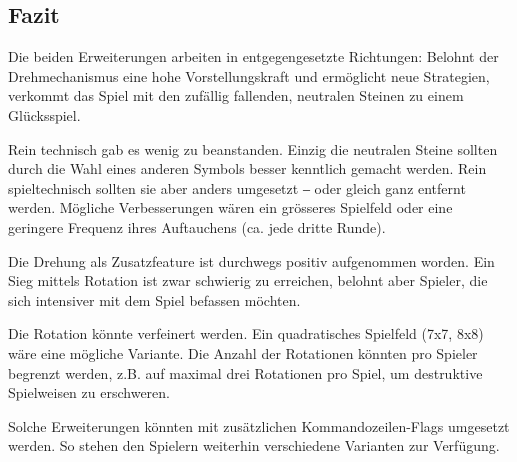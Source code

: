 \documentclass[a4paper,11pt,hidelinks]{scrartcl}
\begin{document}
\subsection{Fazit}

Die beiden Erweiterungen arbeiten in entgegengesetzte Richtungen: Belohnt der Drehmechanismus eine hohe Vorstellungskraft und ermöglicht neue Strategien, verkommt das Spiel mit den zufällig fallenden, neutralen Steinen zu einem Glücksspiel.

Rein technisch gab es wenig zu beanstanden. Einzig die neutralen Steine sollten durch die Wahl eines anderen Symbols besser kenntlich gemacht werden. Rein spieltechnisch sollten sie aber anders umgesetzt ‒ oder gleich ganz entfernt werden. Mögliche Verbesserungen wären ein grösseres Spielfeld oder eine geringere Frequenz ihres Auftauchens (ca. jede dritte Runde).

Die Drehung als Zusatzfeature ist durchwegs positiv aufgenommen worden. Ein Sieg mittels Rotation ist zwar schwierig zu erreichen, belohnt aber Spieler, die sich intensiver mit dem Spiel befassen möchten.

Die Rotation könnte verfeinert werden. Ein quadratisches Spielfeld (7x7, 8x8) wäre eine mögliche Variante. Die Anzahl der Rotationen könnten pro Spieler begrenzt werden, z.B. auf maximal drei Rotationen pro Spiel, um destruktive Spielweisen zu erschweren.

Solche Erweiterungen könnten mit zusätzlichen Kommandozeilen-Flags umgesetzt werden. So stehen den Spielern weiterhin verschiedene Varianten zur Verfügung.

\newpage

\listoffigures
{}
\end{document}
